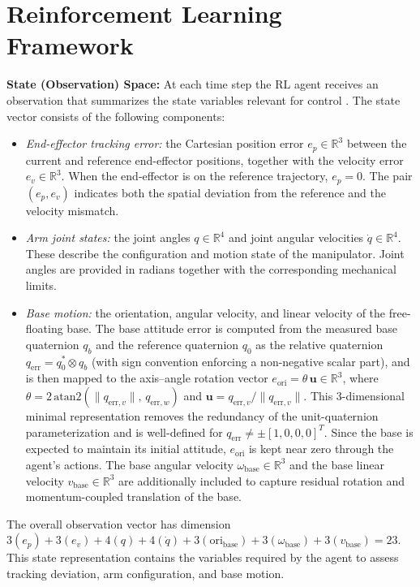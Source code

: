 \documentclass{ieeeaccess}
\begin{document}
\section{Reinforcement Learning Framework}\label{RL}
\textbf{State (Observation) Space:} At each time step the RL agent receives an observation that summarizes the state variables relevant for control \cite{b7}. The state vector consists of the following components:
\begin{itemize}
  \item \textit{End-effector tracking error:} the Cartesian position error $e_p \in \mathbb{R}^3$ between the current and reference end-effector positions, together with the velocity error $e_v \in \mathbb{R}^3$. When the
end-effector is on the reference trajectory, $e_p = 0$. The pair $(e_p, e_v)$
indicates both the spatial deviation from the reference and the velocity mismatch.
  \item \textit{Arm joint states:} the joint angles $q \in \mathbb{R}^4$ and joint angular velocities $\dot{q} \in \mathbb{R}^4$. These describe the configuration and motion state of the manipulator. Joint angles are provided in radians together with the corresponding mechanical limits.
  \item \textit{Base motion:} the orientation, angular velocity, and linear velocity of the free-floating base. The base attitude error is computed from the measured base quaternion $q_b$ and the reference quaternion $q_0$ as the relative quaternion $q_{\mathrm{err}} = q_0^{*} \otimes q_b$ (with sign convention enforcing a non-negative scalar part), and is then mapped to the axis--angle rotation vector $e_{\mathrm{ori}} = \theta\,\mathbf{u} \in \mathbb{R}^3$, where $\theta = 2\,\mathrm{atan2}(\|q_{\mathrm{err},v}\|,\,q_{\mathrm{err},w})$ and $\mathbf{u} = q_{\mathrm{err},v}/\|q_{\mathrm{err},v}\|$. This 3-dimensional minimal representation removes the redundancy of the unit-quaternion parameterization and is well-defined for $q_{\mathrm{err}} \neq \pm[1,0,0,0]^T$. Since the base is expected to maintain its initial attitude, $e_{\mathrm{ori}}$ is kept near zero through the agent's actions. The base angular velocity $\omega_{\mathrm{base}} \in \mathbb{R}^3$ and the base linear velocity $v_{\mathrm{base}} \in \mathbb{R}^3$ are additionally included to capture residual rotation and momentum-coupled translation of the base.
\end{itemize}

The overall observation vector has dimension $3(e_p) + 3(e_v) + 4(q) + 4(\dot{q}) + 3(\mathrm{ori}_{\mathrm{base}}) + 3(\omega_{\mathrm{base}}) + 3(v_{\mathrm{base}}) = 23$. This state representation contains the variables required by the agent to assess tracking deviation, arm configuration, and base motion.
\end{document}
